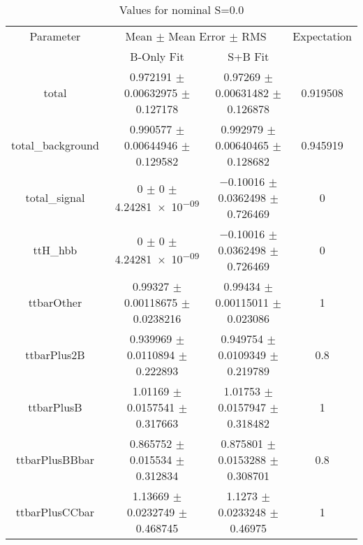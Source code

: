 \begin{table}
\centering
\caption{Values for nominal S=0.0}
\begin{tabular}{cccc}
\toprule
Parameter & \multicolumn{2}{c}{Mean $\pm$ Mean Error $\pm$ RMS} & Expectation\\
 & B-Only Fit & S+B Fit & \\
\midrule
total & \num{0.972191} $\pm$ \num{0.00632975} $\pm$ \num{0.127178} & \num{0.97269} $\pm$ \num{0.00631482} $\pm$ \num{0.126878} & \num{0.919508}\\
total\_background & \num{0.990577} $\pm$ \num{0.00644946} $\pm$ \num{0.129582} & \num{0.992979} $\pm$ \num{0.00640465} $\pm$ \num{0.128682} & \num{0.945919}\\
total\_signal & \num{0} $\pm$ \num{0} $\pm$ \num{4.24281e-09} & \num{-0.10016} $\pm$ \num{0.0362498} $\pm$ \num{0.726469} & \num{0}\\
ttH\_hbb & \num{0} $\pm$ \num{0} $\pm$ \num{4.24281e-09} & \num{-0.10016} $\pm$ \num{0.0362498} $\pm$ \num{0.726469} & \num{0}\\
ttbarOther & \num{0.99327} $\pm$ \num{0.00118675} $\pm$ \num{0.0238216} & \num{0.99434} $\pm$ \num{0.00115011} $\pm$ \num{0.023086} & \num{1}\\
ttbarPlus2B & \num{0.939969} $\pm$ \num{0.0110894} $\pm$ \num{0.222893} & \num{0.949754} $\pm$ \num{0.0109349} $\pm$ \num{0.219789} & \num{0.8}\\
ttbarPlusB & \num{1.01169} $\pm$ \num{0.0157541} $\pm$ \num{0.317663} & \num{1.01753} $\pm$ \num{0.0157947} $\pm$ \num{0.318482} & \num{1}\\
ttbarPlusBBbar & \num{0.865752} $\pm$ \num{0.015534} $\pm$ \num{0.312834} & \num{0.875801} $\pm$ \num{0.0153288} $\pm$ \num{0.308701} & \num{0.8}\\
ttbarPlusCCbar & \num{1.13669} $\pm$ \num{0.0232749} $\pm$ \num{0.468745} & \num{1.1273} $\pm$ \num{0.0233248} $\pm$ \num{0.46975} & \num{1}\\
\bottomrule
\end{tabular}
\end{table}